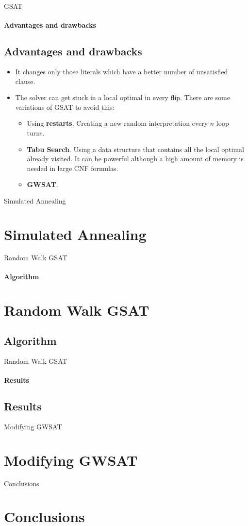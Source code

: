 \documentclass{beamer}
\begin{document}
\begin{frame}{GSAT}
\framesubtitle{Advantages and drawbacks}
\subsection{Advantages and drawbacks}
\begin{itemize}
	\item It changes only those literals which have a better number of unsatisfied clause. 
	\item The solver can get stuck in a local optimal in every flip. There are some variations of GSAT to avoid this:
	\begin{itemize}
		\item Using \textbf{restarts}. Creating a new random interpretation every $n$ loop turns.
		\item \textbf{Tabu Search}. Using a data structure that contains all the local optimal already visited. It can be powerful although a high amount of memory is needed in large CNF formulas.
		\item \textbf{GWSAT}.
	\end{itemize}
\end{itemize}
\end{frame}

\begin{frame}{Simulated Annealing}
\section{Simulated Annealing}
\end{frame}

\begin{frame}{Random Walk GSAT}
\framesubtitle{Algorithm}
\section{Random Walk GSAT}
\subsection{Algorithm}
\end{frame}

\begin{frame}{Random Walk GSAT}
\framesubtitle{Results}
\subsection{Results}
\end{frame}


\begin{frame}{Modifying GWSAT}
\section{Modifying GWSAT}
\end{frame}

\begin{frame}{Conclusions}
\section{Conclusions}
\end{frame}
\end{document}
